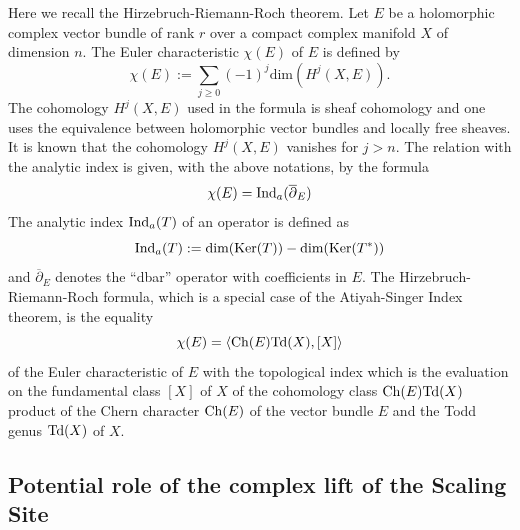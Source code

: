 \documentclass[graybox, envcountsect%
]{svmult}
\def\Ker{{\rm Ker}}
\def\dim{{\mbox{dim}}}
\begin{document}
Here we recall  the Hirzebruch-Riemann-Roch theorem. Let $E$ be a holomorphic complex vector bundle of rank $r$ over a compact complex manifold $X$ of dimension $n$. The Euler characteristic $\chi(E)$ of $E$ is defined by 
\begin{equation}\label{eulerchi}
\chi(E):=\sum_{j\geq 0}(-1)^j\dim(H^j(X,E)).	
\end{equation}
The cohomology $H^j(X,E)$ used in the formula is sheaf cohomology and one uses the equivalence between holomorphic vector bundles and locally free sheaves. It is known that the cohomology $H^j(X,E)$ vanishes for $j>n$.
 The relation with the analytic index is given, with the above notations, by the formula
\begin{equation}\label{eulerchi1}
	\chi(E)={\rm Ind}_a(\overline{\partial}_E)
\end{equation}
The analytic index ${\rm Ind}_a(T)$ of an operator is defined as 
$${\rm Ind}_a(T):=\dim(\Ker(T))-\dim(\Ker(T^*))$$ 
and  $\overline{\partial}_E$ denotes the ``dbar'' operator with coefficients in $E$. The Hirzebruch-Riemann-Roch formula, which is a special case of the Atiyah-Singer Index theorem, is the equality 
\begin{equation}\label{eulerchi2}
	\chi(E)=\langle {\rm Ch}(E){\rm Td}(X), [X]\rangle 
\end{equation}
of the Euler characteristic of $E$ with the topological index which is the evaluation on the fundamental class $[X]$ of $X$ of the cohomology class $ {\rm Ch}(E){\rm Td}(X)$ product of the Chern character ${\rm Ch}(E)$ of the vector bundle $E$ and the Todd genus ${\rm Td}(X)$ of $X$. 


\subsection{Potential role of the complex lift of the Scaling Site}\label{subsect:3.4}
\end{document}
